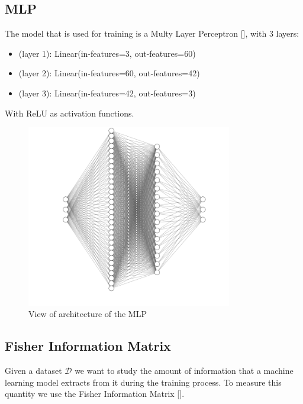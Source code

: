 \documentclass{article}
\begin{document}
\subsection{MLP}
The model that is used for training is a Multy Layer Perceptron [\citeyear{Rosenblatt58theperceptron:}], with 3 layers:
\begin{itemize}
  \item (layer 1): Linear(in-features=3, out-features=60)
  \item (layer 2): Linear(in-features=60, out-features=42)
  \item (layer 3): Linear(in-features=42, out-features=3)
\end{itemize}
With ReLU as activation functions.
\begin{figure}[h]
    \centering
    \includegraphics[width=0.8\textwidth]{images/MLP.png}
    \caption{View of architecture of the MLP }
    \label{fig:MLP}
\end{figure}

\subsection{Fisher Information Matrix}
Given a dataset $\mathcal{D}$ we want to study the amount of information that a machine learning model extracts from it during the training process. To measure this quantity we use the Fisher Information Matrix [\citeyear{FIM}]. 
\end{document}
